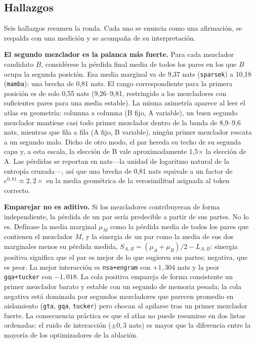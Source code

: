 \subsection{Hallazgos}

Seis hallazgos resumen la ronda. Cada uno se enuncia como una afirmación, se respalda con una medición y se acompaña de su interpretación.

\textbf{El segundo mezclador es la palanca más fuerte.} Para cada mezclador candidato $B$, considérese la pérdida final media de todos los pares en los que $B$ ocupa la segunda posición. Esa media marginal va de 9,37 nats (\texttt{sparsek}) a 10,18 (\texttt{mamba}): una brecha de 0,81 nats. El rango correspondiente para la primera posición es de solo 0,55 nats (9,26--9,81, restringido a los mezcladores con suficientes pares para una media estable). La misma asimetría aparece al leer el atlas en geometría: columna a columna (B fijo, A variable), un buen segundo mezclador mantiene casi todo primer mezclador dentro de la banda de 8,9--9,6 nats, mientras que fila a fila (A fijo, B variable), ningún primer mezclador rescata a un segundo malo. Dicho de otro modo, el par hereda su techo de su segunda capa y, a esta escala, la elección de B vale aproximadamente 1,5$\times$ la elección de A. Las pérdidas se reportan en nats---la unidad de logaritmo natural de la entropía cruzada---, así que una brecha de 0,81 nats equivale a un factor de $e^{0{,}81} \approx 2{,}2\times$ en la media geométrica de la verosimilitud asignada al token correcto.

\textbf{Emparejar no es aditivo.} Si los mezcladores contribuyeran de forma independiente, la pérdida de un par sería predecible a partir de sus partes. No lo es. Defínase la media marginal $\mu_M$ como la pérdida media de todos los pares que contienen el mezclador $M$, y la sinergia de un par como la media de sus dos marginales menos su pérdida medida, $S_{A,B} = (\mu_A + \mu_B)/2 - L_{A,B}$: sinergia positiva significa que el par es mejor de lo que sugieren sus partes; negativa, que es peor. La mejor interacción es \texttt{nsa+engram} con $+1{,}304$ nats y la peor \texttt{gqa+tucker} con $-1{,}018$. La cola positiva empareja de forma consistente un primer mezclador barato y estable con un segundo de memoria pesada; la cola negativa está dominada por segundos mezcladores que parecen promedio en aislamiento (\texttt{gta}, \texttt{gqa}, \texttt{tucker}) pero chocan al apilarse tras un primer mezclador fuerte. La consecuencia práctica es que el atlas no puede resumirse en dos listas ordenadas: el ruido de interacción ($\pm 0{,}3$ nats) es mayor que la diferencia entre la mayoría de los optimizadores de la ablación.

